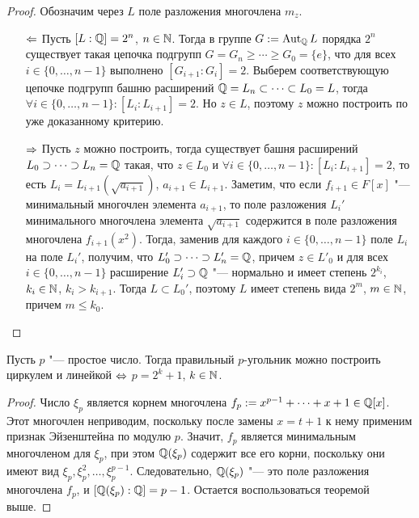 \begin{proof}
	Обозначим через $L$ поле разложения многочлена $m_{z}$.
	\begin{itemize}
		\item[$\Leftarrow$] Пусть $[L : \mathbb{Q}] = 2^n$, $n \in \mathbb{N}$. Тогда в группе $G := \operatorname{Aut}_{\mathbb{Q}}{L}$ порядка $2^n$ существует такая цепочка подгрупп $G = G_n \ge \dotsb \ge G_0 = \{e\}$, что для всех $i \in \{0, \dotsc, n - 1\}$ выполнено $[G_{i+1} : G_{i}] = 2$. Выберем соответствующую цепочке подгрупп башню расширений $\mathbb{Q} = L_n \subset \dotsb \subset L_0 = L$, тогда $\forall i \in \{0, \dotsc, n-1\}: [L_i : L_{i+1}] = 2$. Но $z \in L$, поэтому $z$ можно построить по уже доказанному критерию.
		
		\item[$\Rightarrow$] Пусть $z$ можно построить, тогда существует башня расширений $L_0 \supset \dotsb \supset L_n = \mathbb{Q}$ такая, что $z \in L_0$ и $\forall i \in \{0, \dotsc, n-1\}: [L_{i} : L_{i + 1}] = 2$, то есть $L_{i} = L_{i + 1}(\sqrt{a_{i+1}})$, $a_{i+1} \in L_{i+1}$. Заметим, что если $f_{i+1} \in F[x]$ "--- минимальный многочлен элемента $a_{i+1}$, то поле разложения $L_i'$ минимального многочлена элемента $\sqrt{a_{i+1}}$ содержится в поле разложения многочлена $f_{i+1}(x^2)$. Тогда, заменив для каждого $i \in \{0 ,\dotsc, n-1\}$ поле $L_{i}$ на поле $L_i'$, получим, что $L'_0 \supset \dotsb \supset L'_n = \mathbb{Q}$, причем $z \in L'_0$ и для всех $i \in \{0, \dotsc, n - 1\}$ расширение $L'_i \supset \mathbb{Q}$ "--- нормально и имеет степень $2^{k_i}$, $k_i \in \mathbb{N}$, $k_i > k_{i+1}$. Тогда $L \subset L_0'$, поэтому $L$ имеет степень вида $2^m$, $m \in \mathbb{N}$, причем $m \le k_0$.\qedhere
	\end{itemize}
\end{proof}

\begin{corollary}
	Пусть $p$ "--- простое число. Тогда правильный $p$-угольник можно построить циркулем и линейкой $\Leftrightarrow$ $p = 2^k + 1$, $k \in \mathbb{N}$.
\end{corollary}

\begin{proof}
	Число $\xi_p$ является корнем многочлена $f_p := x^{p - 1} + \dotsb + x + 1 \in \mathbb{Q}[x]$. Этот многочлен неприводим, поскольку после замены $x = t + 1$ к нему применим признак Эйзенштейна по модулю $p$. Значит, $f_p$ является минимальным многочленом для $\xi_p$, при этом $\mathbb{Q}(\xi_p)$ содержит все его корни, поскольку они имеют вид $\xi_p, \xi_p^2, \dotsc, \xi_p^{p - 1}$. Следовательно, $\mathbb{Q}(\xi_p)$ "--- это поле разложения многочлена $f_p$, и $[\mathbb{Q}(\xi_p) : \mathbb{Q}] = p - 1$. Остается воспользоваться теоремой выше.
\end{proof}

